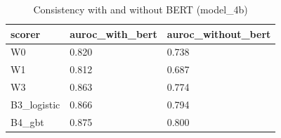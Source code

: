 \begin{table}[t]
\centering
\small
\begin{tabular}{lll}
\hline
scorer & auroc\_with\_bert & auroc\_without\_bert \\
\hline
W0 & 0.820 & 0.738 \\
W1 & 0.812 & 0.687 \\
W3 & 0.863 & 0.774 \\
B3\_logistic & 0.866 & 0.794 \\
B4\_gbt & 0.875 & 0.800 \\
\hline
\end{tabular}
\caption{Consistency with and without BERT (model\_4b)}
\label{tab:bert_model_4b}
\end{table}
